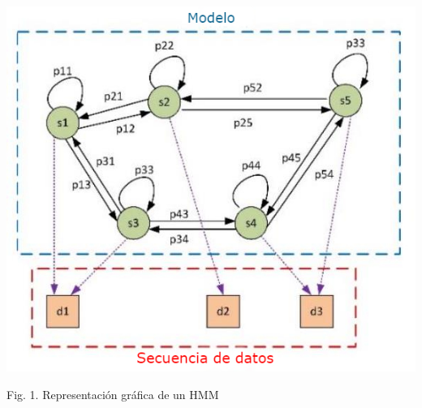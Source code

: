 \documentclass[10pt]{article}
\begin{document}
\includegraphics[max width=\textwidth]{2022_09_15_69d89c46b49bb93649d1g-03}

Fig. 1. Representación gráfica de un HMM\\
\end{document}
